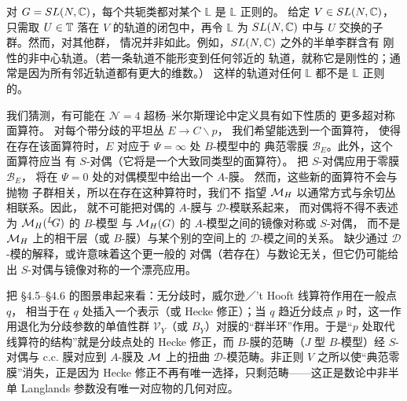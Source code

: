 对 $G=SL(N,{\mathbb{C}})$，每个共轭类都对某个 $\mathbb{L}$ 是 $\mathbb{L}$ 正则的。
给定 $V\in SL(N,{\mathbb{C}})$，
只需取 $U\in {\mathbb{T}}$ 落在 $V$ 的轨道的闭包中，再令 $\mathbb{L}$
为 $SL(N,{\mathbb{C}})$ 中与 $U$ 交换的子群。然而，对其他群，
情况并非如此。例如，$SL(N,{\mathbb{C}})$ 之外的半单李群含有
刚性的非中心轨道。（若一条轨道不能形变到任何邻近的
轨道，就称它是刚性的；通常是因为所有邻近轨道都有更大的维数。）
这样的轨道对任何 $\mathbb{L}$ 都不是 $\mathbb{L}$ 正则的。

我们猜测，有可能在 ${\mathcal N}=4$ 超杨–米尔斯理论中定义具有如下性质的
更多超对称面算符。
对每个带分歧的平坦丛 $E\to C\backslash p$，
我们希望能选到一个面算符，
使得在存在该面算符时，$E$ 对应于 $\Psi=\infty$ 处 $B$-模型中的
典范零膜 ${\mathcal B}_E$。此外，这个面算符应当
有 $S$-对偶（它将是一个大致同类型的面算符）。
把 $S$-对偶应用于零膜 ${\mathcal B}_E$，
将在 $\Psi=0$ 处的对偶模型中给出一个 $A$-膜。
然而，这些新的面算符不会与抛物
子群相关，所以在存在这种算符时，我们不
指望 ${{\mathcal{M}}_H}$ 以通常方式与余切丛相联系。因此，
就不可能把对偶的 $A$-膜与 ${\mathcal D}$-模联系起来，
而对偶将不得不表述为 ${{\mathcal{M}}_H}({}^L\negthinspace G)$ 的 $B$-模型
与 ${{\mathcal{M}}_H}(G)$ 的 $A$-模型之间的镜像对称或 $S$-对偶，
而不是 ${{\mathcal{M}}_H}$ 上的相干层（或 $B$-膜）与某个别的空间上的
${\mathcal D}$-模之间的关系。
缺少通过 ${\mathcal D}$-模的解释，或许意味着这个更一般的
对偶（若存在）与数论无关，但它仍可能给出
$S$-对偶与镜像对称的一个漂亮应用。

\begin{yizhu}[物理图像补充]把 §4.5--§4.6 的图景串起来看：无分歧时，威尔逊／'t Hooft 线算符作用在一般点 $q$，
相当于在 $q$ 处插入一个表示（或 Hecke 修正）；当 $q$ 趋近分歧点 $p$ 时，这一作用退化为分歧参数的单值性群
$\mathcal V_Y$（或 $B_Y$）对膜的“群半环”作用。于是“$p$ 处取代线算符的结构”就是分歧点处的
Hecke 修正，而 $B$-膜的范畴（$J$ 型 $B$-模型）经 $S$-对偶与 c.c. 膜对应到 $A$-膜及
${\mathcal{M}}$ 上的扭曲 ${\mathcal D}$-模范畴。非正则 $V$ 之所以使“典范零膜”消失，正是因为
Hecke 修正不再有唯一选择，只剩范畴——这正是数论中非半单 Langlands 参数没有唯一对应物的几何对应。\end{yizhu}
